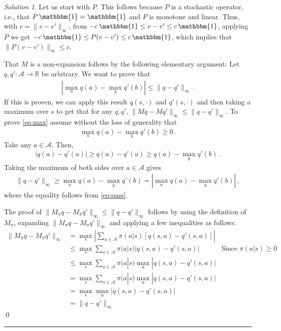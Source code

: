 \documentclass{article}
\newcommand{\norm}[1]{\| #1 \|}
\newcommand{\R}{\mathbb{R}}
\DeclareMathOperator*{\1}{\mathbbm{1}}
\theoremstyle{definition}
\theoremstyle{remark}
\newtheorem*{solution*}{Solution}
\newcommand{\cA}{\mathcal{A}}
\begin{document}
\begin{solution*}
Let us start with $P$.
This follows because $P$ is a stochastic operator, i.e., that $P \1 = \1$ and $P$ is monotone and linear.
Thus, with $c= \norm{v-v'}_\infty$,
 from $-c \1 \le v-v' \le c \1$, applying $P$ we get $-c \1 \le P(v-v') \le c \1$, which implies that $\norm{P(v-v')}_\infty \le c$.
 
That $M$ is a non-expansion follows by the following elementary argument:
Let $q,q':\cA \to \R$ be arbitrary. We want to prove that 
\begin{align}
|\max_a q(a) - \max_b q'(b) | \le \norm{q-q'}_\infty\,.
\label{eq:max}
\end{align}
If this is proven, we can apply this result
$q(s,\cdot)$ and $q'(s,\cdot)$ and then taking a maximum over $s$ to get that for any $q,q'$, $\norm{Mq - M q'}_\infty \le \norm{q-q'}_\infty$.
To prove \eqref{eq:max} assume without the loss of generality that 
\begin{align}
\max_a q(a) - \max_b q'(b) \ge 0\,.
\label{eq:qass}
\end{align}
Take any $a\in \cA$. Then,
\begin{align*}
|q(a)-q'(a)| \ge q(a) - q'(a) \ge q(a) - \max_b q'(b)\,.
\end{align*}
Taking the maximum of both sides over $a\in \cA$ gives
\begin{align*}
\norm{q-q'}_\infty \ge \max_a q(a) - \max_b q'(b) = |\max_a q(a) - \max_b q'(b)|\,,
\end{align*}
where the equality follows from \eqref{eq:qass}.

The proof of $\norm{M_\pi q - M_\pi q'}_\infty \le \norm{q-q'}_\infty$ follows by using the definition of $M_\pi$, expanding $\norm{M_\pi q - M_\pi q'}_\infty$ and applying a few inequalities as follows:
\begin{align*}
    \norm{M_\pi q - M_\pi q'}_\infty
    &= \max_s \left|\sum_{a \in \cA} \pi(a | s) \left[q(s, a) - q'(s, a)\right]\right| \\ 
    &\le \max_s \sum_{a \in \cA} \pi(a | s) |q(s, a) - q'(s, a)| & \text{Since $\pi(a|s) \geq 0$}\\ 
    &\leq \max_s \sum_{a \in \cA} \pi(a | s) \max_a |q(s, a) - q'(s, a)| \\ 
    &= \max_s \sum_{a \in \cA} \pi(a | s) \max_a |q(s, a) - q'(s, a)| \\ 
    &= \max_s \max_a |q(s, a) - q'(s, a)| \\ 
    &= \norm{q - q'}_\infty 
\end{align*}
\qed\par\smallskip\hrule
\end{solution*}
\end{document}
